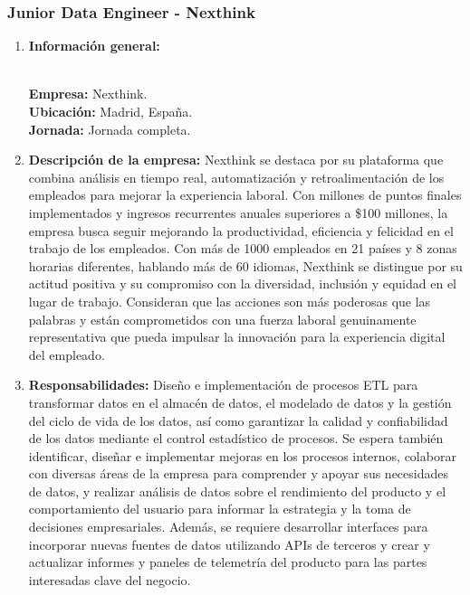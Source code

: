\documentclass[12pt]{article}
\begin{document}
            \subsubsection{Junior Data Engineer - Nexthink}
                \begin{enumerate}
                    \item \textbf{Información general:}
                    
                        \textbf{\\Empresa:} Nexthink.
                        \textbf{\\Ubicación:} Madrid, España.
                        \textbf{\\Jornada:} Jornada completa.

                    \item \textbf{Descripción de la empresa:}
                        Nexthink se destaca por su plataforma que combina análisis en tiempo real, automatización y retroalimentación de los empleados para mejorar la experiencia laboral. Con millones de puntos finales implementados y ingresos recurrentes anuales superiores a \$100 millones, la empresa busca seguir mejorando la productividad, eficiencia y felicidad en el trabajo de los empleados. Con más de 1000 empleados en 21 países y 8 zonas horarias diferentes, hablando más de 60 idiomas, Nexthink se distingue por su actitud positiva y su compromiso con la diversidad, inclusión y equidad en el lugar de trabajo. Consideran que las acciones son más poderosas que las palabras y están comprometidos con una fuerza laboral genuinamente representativa que pueda impulsar la innovación para la experiencia digital del empleado.

                    \item \textbf{Responsabilidades:}
                        Diseño e implementación de procesos ETL para transformar datos en el almacén de datos, el modelado de datos y la gestión del ciclo de vida de los datos, así como garantizar la calidad y confiabilidad de los datos mediante el control estadístico de procesos. Se espera también identificar, diseñar e implementar mejoras en los procesos internos, colaborar con diversas áreas de la empresa para comprender y apoyar sus necesidades de datos, y realizar análisis de datos sobre el rendimiento del producto y el comportamiento del usuario para informar la estrategia y la toma de decisiones empresariales. Además, se requiere desarrollar interfaces para incorporar nuevas fuentes de datos utilizando APIs de terceros y crear y actualizar informes y paneles de telemetría del producto para las partes interesadas clave del negocio.
                    

\end{enumerate}
\end{document}
